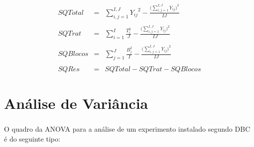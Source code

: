 \documentclass[14pt,aspectratio=1610]{beamer}
\begin{document}
\begin{frame}{}
\frametitle{}
\begin{block}{}
\justifying
\begin{eqnarray*}
  SQTotal &=& \sum_{i,j=1}^{I,J} {Y_{ij}}^2 - \frac{\bigg(\sum_{i,j=1}^{I,J} Y_{ij} \bigg)^2}{IJ} \\
  \\
  SQTrat &=& \sum_{i=1}^{I} \frac{T_i^2}{J} - \frac{\bigg(\sum_{i,j=1}^{I,J} Y_{ij}\bigg)^2}{IJ} \\
  \\
  SQBlocos &=& \sum_{j=1}^{J} \frac{B_j^2}{I} -  \frac{\bigg(\sum_{i,j=1}^{I,J} Y_{ij}\bigg)^2}{IJ}\\
  \\
  SQRes &=& SQTotal - SQTrat - SQBlocos
\end{eqnarray*}

\end{block}
\end{frame}

\section{Análise de Variância}
\begin{frame}{}
\frametitle{}
\begin{block}{}
\justifying
O quadro da ANOVA para a análise de um experimento instalado segundo DBC é do seguinte tipo:
\begin{table}[!h]
\end{table}
\end{block}
\end{frame}
\end{document}
